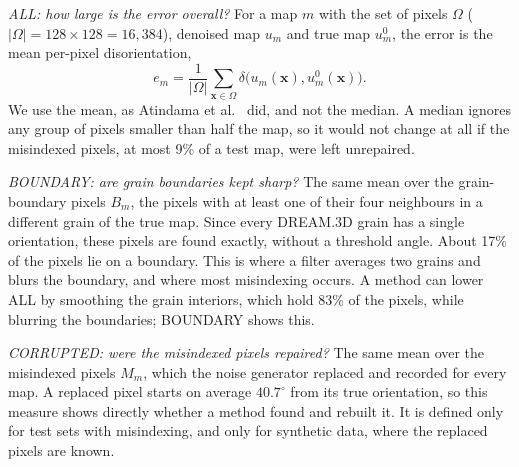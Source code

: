 \emph{ALL: how large is the error overall?} For a map $m$ with the set of
pixels $\Omega$ ($|\Omega| = 128 \times 128 = 16{,}384$), denoised map $u_m$
and true map $u^0_m$, the error is the mean per-pixel disorientation,
\begin{equation}
  e_m = \frac{1}{|\Omega|} \sum_{\mathbf{x} \in \Omega}
        \delta\big(u_m(\mathbf{x}), u^0_m(\mathbf{x})\big).
  \label{eq:error}
\end{equation}
We use the mean, as Atindama et al.~\cite{atindama2023restoration} did, and
not the median. A median ignores any group of pixels smaller than half the
map, so it would not change at all if the misindexed pixels, at most 9\% of a
test map, were left unrepaired.

\emph{BOUNDARY: are grain boundaries kept sharp?} The same mean over the
grain-boundary pixels $B_m$, the pixels with at least one of their four
neighbours in a different grain of the true map. Since every DREAM.3D grain
has a single orientation, these pixels are found exactly, without a threshold
angle. About 17\% of the pixels lie on a boundary. This is where a filter
averages two grains and blurs the boundary, and where most misindexing
occurs. A method can lower ALL by smoothing the grain interiors, which hold
83\% of the pixels, while blurring the boundaries; BOUNDARY shows this.

\emph{CORRUPTED: were the misindexed pixels repaired?} The same mean over the
misindexed pixels $M_m$, which the noise generator replaced and recorded for
every map. A replaced pixel starts on average $40.7^\circ$ from its true
orientation, so this measure shows directly whether a method found and
rebuilt it. It is defined only for test sets with misindexing, and only for
synthetic data, where the replaced pixels are known.

